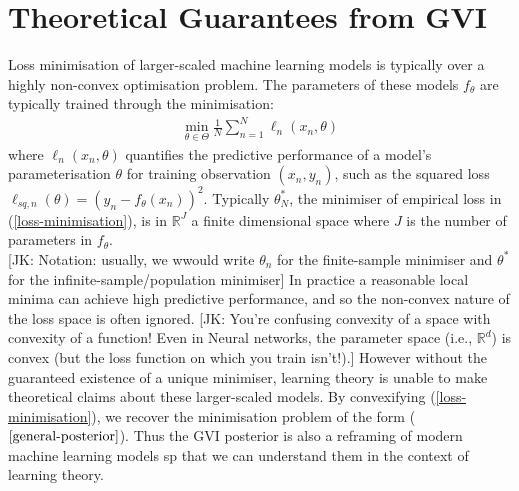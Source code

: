\documentclass[twoside,11pt]{article}
\newcommand{\jk}[1]{{\color{blue} [JK: #1]}}
\begin{document}
\section{Theoretical Guarantees from GVI \cite{wild2023rigorous}}
Loss minimisation of larger-scaled machine learning models is typically over a highly non-convex optimisation problem. The parameters of these models $f_{\theta}$ are typically trained through the minimisation:
\begin{align}
\min_{\theta \in \Theta} \frac{1}{N}\sum_{n=1}^N\ell_n(x_n, \theta)
\label{loss-minimisation}
\end{align}
where $\ell_n(x_n, \theta)$ quantifies the predictive performance of a model's parameterisation $\theta$ for training observation $(x_n, y_n)$, such as the squared loss $\ell_{sq, n}(\theta) = \left(y_n - f_{\theta}(x_n)\right)^2$. Typically $\theta_N^*$, the minimiser of empirical loss in (\ref{loss-minimisation}), is in $ \mathbb{R}^J$ a finite dimensional space where $J$ is the number of parameters in $f_{\theta}$.\\
\jk{Notation: usually, we wwould write $\theta_n$ for the finite-sample minimiser and $\theta^*$ for the infinite-sample/population minimiser}
\newline
In practice a reasonable local minima can achieve high predictive performance, and so the non-convex nature of the loss space is often ignored.
\jk{You're confusing convexity of a space with convexity of a function! Even in Neural networks, the parameter space (i.e., $\mathbb{R}^d$) is convex (but the loss function on which you train isn't!).}
However without the guaranteed existence of a unique minimiser, learning theory is unable to make theoretical claims about these larger-scaled models. By convexifying (\ref{loss-minimisation}), we recover the minimisation problem of the form ($\ref{general-posterior}$). Thus the GVI posterior is also a reframing of modern machine learning models sp that we can understand them in the context of learning theory.
\end{document}
